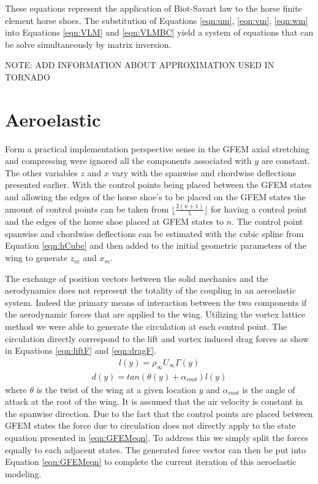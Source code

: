 \documentclass[11pt]{ucthesis}
\begin{document}
These equations represent the application of Biot-Savart law to the horse finite element horse shoes. The substitution of Equations \ref{eqn:um}, \ref{eqn:vm}, \ref{eqn:wm} into Equations \ref{eqn:VLM} and \ref{eqn:VLMBC} yield a system of equations that can be solve simultaneously by matrix inversion. 

{\color{red}NOTE: ADD INFORMATION ABOUT APPROXIMATION USED IN TORNADO}

\section{Aeroelastic}
Form a practical implementation perspective sense in the GFEM axial stretching and compressing were ignored all the components associated with $y$ are constant. The other variables $z$ and $x$ vary with the spanwise and chordwise deflections presented earlier. With the control points being placed between the GFEM states and allowing the edges of the horse shoe's to be placed on the GFEM states the amount of control points can be taken from $\lfloor \frac{2(n+1)}{5}\rfloor$ for having a control point and the edges of the horse shoe placed at GFEM states to $n$. The control point spanwise and chordwise deflections can be estimated with the cubic spline from Equation \ref{eqn:hCube} and then added to the initial geometric parameters of the wing to generate $z_m$ and $x_m$.

The exchange of position vectors between the solid mechanics and the aerodynamics does not represent the totality of the coupling in an aeroelastic system. Indeed the primary means of interaction between the two components if the aerodynamic forces that are applied to the wing. Utilizing the vortex lattice method we were able to generate the circulation at each control point. The circulation directly correspond to the lift and vortex induced drag forces as show in Equations \ref{eqn:liftF} and \ref{eqn:dragF}.
\begin{eqnarray}
l(y) = \rho_{\infty}U_{\infty}\Gamma(y)
\label{eqn:liftF}
\end{eqnarray}
\begin{eqnarray}
d(y) = tan(\theta(y)+\alpha_{root})l(y)
\label{eqn:dragF}
\end{eqnarray}
where $\theta$ is the twist of the wing at a given location $y$ and $\alpha_{root}$ is the angle of attack at the root of the wing. It is assumed that the air velocity is constant in the spanwise direction. Due to the fact that the control points are placed between GFEM states the force due to circulation does not directly apply to the state equation presented in \ref{eqn:GFEMeqn}. To address this we simply split the forces equally to each adjacent states. The generated force vector can then be put into Equation \ref{eqn:GFEMeqn} to complete the current iteration of this aeroelastic modeling.
\end{document}
